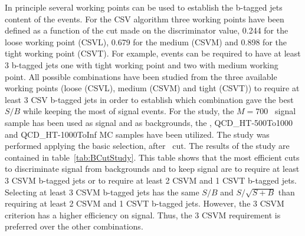 In principle several working points can be used to establish the b-tagged jets content of the events. For the CSV algorithm three working points have been defined as a function of the cut made on the discriminator value, 0.244 for the loose working point (CSVL), 0.679 for the medium (CSVM) and 0.898 for the tight working point (CSVT). For example, events can be required to have at least 3 b-tagged jets one with tight working point and two with medium working point. All possible combinations have been studied from the three available working points (loose (CSVL), medium (CSVM) and tight (CSVT)) to require at least 3 CSV b-tagged jets in order to establish which combination gave the best $S/B$ while keeping the most of signal events. For the study, the $M=700$ \GeVcc~signal sample has been used as signal and as backgrounds, the \ttbar, QCD\_HT-500To1000 and QCD\_HT-1000ToInf MC samples have been utilized. The study was performed applying the basic selection, after \HT~cut. The results of the study are contained in table~\ref{tab:BCutStudy}. This table shows that the most efficient cuts to discriminate signal from backgrounds and to keep signal are to require at least 3 CSVM b-tagged jets or to require at least 2 CSVM and 1 CSVT b-tagged jets. Selecting at least 3 CSVM b-tagged jets has the same $S/B$ and $S/\sqrt{S+B}$ than requiring at least 2 CSVM and 1 CSVT b-tagged jets. However, the 3 CSVM criterion has a higher efficiency on signal. Thus, the 3 CSVM requirement is preferred over the other combinations. %

